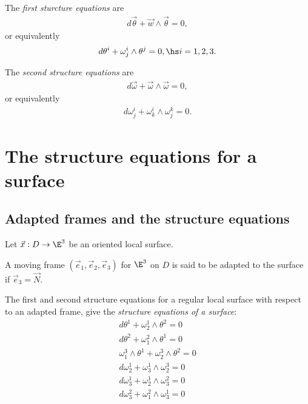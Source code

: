 \documentclass{article}
\begin{document}
\begin{theorem}
    The \emph{first sturcture equations} are
    \begin{align*}
        d\vec\theta + \vec w \wedge \vec \theta = 0,
    \end{align*}
    or equivalently
    \begin{align*}
        d\theta^i + \omega_j^i \wedge \theta^j = 0,\hs i=1,2,3.
    \end{align*}
\end{theorem}

\begin{theorem}
    The \emph{second structure equations} are
    \begin{align*}
        d\vec\omega + \vec \omega \wedge\vec \omega = 0,
    \end{align*}
    or equivalently
    \begin{align*}
        d\omega_j^i + \omega_k^i\wedge\omega_j^k=0.
    \end{align*}
\end{theorem}

\section{The structure equations for a surface}

\subsection{Adapted frames and the structure equations}

Let $\vec x: D \to \E^3$ be an oriented local surface.

\begin{definition}
    A moving frame $(\vec e_1, \vec e_2, \vec e_3)$ for $\E^3$ on $D$
    is said to be adapted to the surface if $\vec e_3 = \vec N$.
\end{definition}

\begin{proposition}[Notes 11.2]
    The first and second structure equations for a regular local surface
    with respect to an adapted frame, give the \emph{structure equations
        of a surface}:
    \begin{align*}
        d\theta^1 + \omega_2^1\wedge\theta^2 = 0                \\
        d\theta^2 + \omega_1^2\wedge\theta^1 = 0                \\
        \omega_1^3\wedge\theta^1 + \omega_2^3\wedge\theta^2 = 0 \\
        d\omega_2^1+\omega_3^1\wedge\omega_2^3 = 0              \\
        d\omega_3^1 + \omega_2^1 \wedge \omega_3^2 = 0          \\
        d\omega_3^2 + \omega_1^2 \wedge \omega_3^1 = 0
    \end{align*}
\end{proposition}
\end{document}
